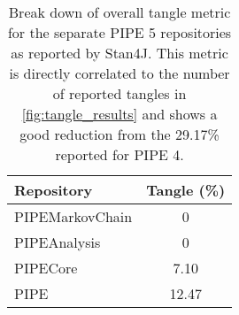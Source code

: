 
\begin{table}[tb]
\small
\begin{center}
  \begin{tabular}{| l | c |}
    \hline
    Repository & Tangle (\%) \\ 
    \hline
    PIPEMarkovChain & 0 \\ 
    \hline
    PIPEAnalysis & 0 \\    
    \hline
    PIPECore & 7.10\\
    \hline
    PIPE & 12.47\\
    \hline

  \end{tabular}
\caption{Break down of overall tangle metric for the separate PIPE 5 repositories as reported by Stan4J. This metric is directly correlated to the number of reported tangles in \cref{fig:tangle_results} and shows a good reduction from the 29.17\% reported for PIPE 4. }
\label{tbl:tangle_results}
\end{center}
\end{table}